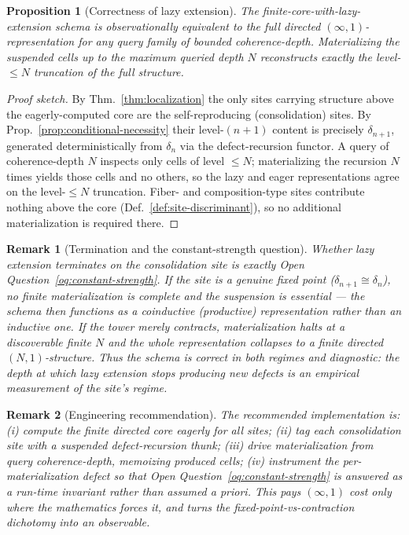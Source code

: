 \documentclass[11pt]{article}
\newtheorem{proposition}{Proposition}
\newtheorem{remark}{Remark}
\begin{document}
\begin{proposition}[Correctness of lazy extension]
\label{prop:lazy-correct}
The finite-core-with-lazy-extension schema is observationally equivalent to the full directed
$(\infty,1)$-representation for any query family of bounded coherence-depth. Materializing the
suspended cells up to the maximum queried depth $N$ reconstructs exactly the level-$\leq N$
truncation of the full structure.
\end{proposition}

\begin{proof}[Proof sketch]
By Thm.~\ref{thm:localization} the only sites carrying structure above the eagerly-computed
core are the self-reproducing (consolidation) sites. By Prop.~\ref{prop:conditional-necessity}
their level-$(n+1)$ content is precisely $\delta_{n+1}$, generated deterministically from
$\delta_n$ via the defect-recursion functor. A query of coherence-depth $N$ inspects only cells
of level $\leq N$; materializing the recursion $N$ times yields those cells and no others, so the
lazy and eager representations agree on the level-$\leq N$ truncation. Fiber- and
composition-type sites contribute nothing above the core (Def.~\ref{def:site-discriminant}), so
no additional materialization is required there.
\end{proof}

\begin{remark}[Termination and the constant-strength question]
Whether lazy extension \emph{terminates} on the consolidation site is exactly
Open Question~\ref{oq:constant-strength}. If the site is a genuine fixed point
($\delta_{n+1} \cong \delta_n$), no finite materialization is complete and the suspension is
essential --- the schema then functions as a coinductive (productive) representation rather than
an inductive one. If the tower merely contracts, materialization halts at a discoverable finite
$N$ and the whole representation collapses to a finite directed $(N,1)$-structure. Thus the
schema is correct in both regimes and \emph{diagnostic}: the depth at which lazy extension stops
producing new defects is an empirical measurement of the site's regime.
\end{remark}

\begin{remark}[Engineering recommendation]
The recommended implementation is: (i) compute the finite directed core eagerly for all sites;
(ii) tag each consolidation site with a suspended defect-recursion thunk; (iii) drive
materialization from query coherence-depth, memoizing produced cells; (iv) instrument the
per-materialization defect so that Open Question~\ref{oq:constant-strength} is answered as a
run-time invariant rather than assumed a priori. This pays $(\infty,1)$ cost only where the
mathematics forces it, and turns the fixed-point-vs-contraction dichotomy into an observable.
\end{remark}
\end{document}
